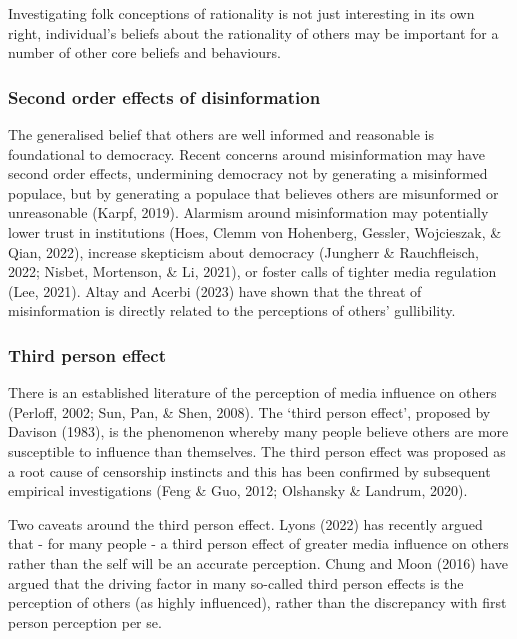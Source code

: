 \documentclass[
  ,jou,floatsintext]{apa6}
\begin{document}
Investigating folk conceptions of rationality is not just interesting in its own right, individual's beliefs about the rationality of others may be important for a number of other core beliefs and behaviours.

\hypertarget{second-order-effects-of-disinformation}{%
\subsubsection{Second order effects of disinformation}\label{second-order-effects-of-disinformation}}

The generalised belief that others are well informed and reasonable is foundational to democracy. Recent concerns around misinformation may have second order effects, undermining democracy not by generating a misinformed populace, but by generating a populace that believes others are misunformed or unreasonable (Karpf, 2019). Alarmism around misinformation may potentially lower trust in institutions (Hoes, Clemm von Hohenberg, Gessler, Wojcieszak, \& Qian, 2022), increase skepticism about democracy (Jungherr \& Rauchfleisch, 2022; Nisbet, Mortenson, \& Li, 2021), or foster calls of tighter media regulation (Lee, 2021). Altay and Acerbi (2023) have shown that the threat of misinformation is directly related to the perceptions of others' gullibility.

\hypertarget{third-person-effect}{%
\subsubsection{Third person effect}\label{third-person-effect}}

There is an established literature of the perception of media influence on others (Perloff, 2002; Sun, Pan, \& Shen, 2008). The `third person effect', proposed by Davison (1983), is the phenomenon whereby many people believe others are more susceptible to influence than themselves. The third person effect was proposed as a root cause of censorship instincts and this has been confirmed by subsequent empirical investigations (Feng \& Guo, 2012; Olshansky \& Landrum, 2020).

Two caveats around the third person effect. Lyons (2022) has recently argued that - for many people - a third person effect of greater media influence on others rather than the self will be an accurate perception. Chung and Moon (2016) have argued that the driving factor in many so-called third person effects is the perception of others (as highly influenced), rather than the discrepancy with first person perception per se.
\end{document}
